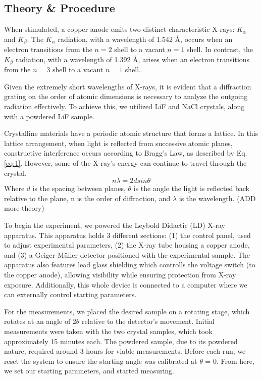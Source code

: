 \documentclass[a4paper,12pt,english]{all-in-one} %
\newcommand\tab[1][1cm]{\hspace*{#1}}
\begin{document}
\begin{multicols}{2}

\section*{Theory \& Procedure}
{
\tab When stimulated, a copper anode emits two distinct characteristic X-rays: $K_\alpha$ and $K_\beta$. The $K_\alpha$ radiation, with a wavelength of 1.542 Å, occurs when an electron transitions from the $n=2$ shell to a vacant $n=1$ shell. In contrast, the $K_\beta$ radiation, with a wavelength of 1.392 Å, arises when an electron transitions from the $n=3$ shell to a vacant $n=1$ shell.

Given the extremely short wavelengths of X-rays, it is evident that a diffraction grating on the order of atomic dimensions is necessary to analyze the outgoing radiation effectively. To achieve this, we utilized LiF and NaCl crystals, along with a powdered LiF sample.

Crystalline materials have a periodic atomic structure that forms a lattice. In this lattice arrangement, when light is reflected from successive atomic planes, constructive interference occurs according to Bragg's Law, as described by Eq.\eqref{eq:1}. However, some of the X-ray's energy can continue to travel through the crystal.
\begin{equation}\label{eq:1}
    n\lambda = 2dsin\theta
\end{equation}
Where $d$ is the spacing between planes, $\theta$ is the angle the light is reflected back relative to the plane, n is the order of diffraction, and $\lambda$ is the wavelength.
(ADD more theory)

To begin the experiment, we powered the Leybold Didactic (LD) X-ray apparatus. This apparatus holds 3 different sections: (1) the control panel, used to adjust experimental parameters, (2) the X-ray tube housing a copper anode, and (3) a Geiger-Müller detector positioned with the experimental sample. The apparatus also features lead glass shielding which controlls the voltage switch (to the copper anode), allowing visibility while ensuring protection from X-ray exposure. Additionally, this whole device is connected to a computer where we can externally control starting parameters. 

For the measurements, we placed the desired sample on a rotating stage, which rotates at an angle of 2$\theta$ relative to the detector’s movement. Initial measurements were taken with the two crystal samples, which took approximately 15 minutes each. The powdered sample, due to its powdered nature, required around 3 hours for viable measurements. Before each run, we reset the system to ensure the starting angle was calibrated at $\theta$ = 0. From here, we set our starting parameters, and started measuring.  
}
    

\end{multicols}
\end{document}
